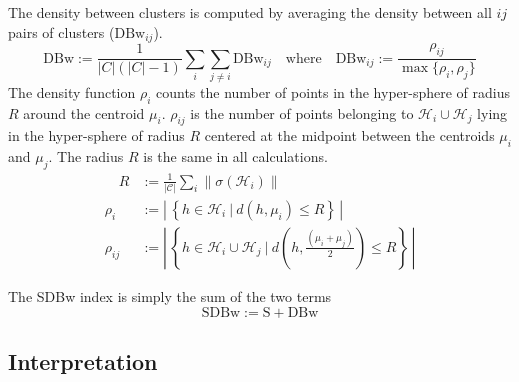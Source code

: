 The density between clusters is computed by averaging the density between all $ij$ pairs of clusters ($\textrm{DBw}_{ij}$).
\begin{equation*}
  \textrm{DBw} := \frac{1}{|C| (|C| - 1)} \sum_{i} \sum_{j \neq i} \textrm{DBw}_{ij}
  \quad \textrm{where} \quad
  \textrm{DBw}_{ij} := \frac{\rho_{ij}}{\max\{\rho_{i},\rho_{j}\}}
\end{equation*}
The density function $\rho_i$ counts the number of points in the hyper-sphere of radius $R$ around the centroid $\mu_i$. $\rho_{ij}$ is the number of points belonging to $\mathcal{H}_i \cup \mathcal{H}_j$ lying in the hyper-sphere of radius $R$ centered at the midpoint between the centroids $\mu_i$ and $\mu_j$. The radius $R$ is the same in all calculations.
\begin{align*}
  \quad R &:= \frac{1}{|\mathcal{C}|} \sum_i \| \sigma (\mathcal{H}_i)\| \\
  \rho_{i} &:= \left| \, \left\{ h \in \mathcal{H}_i \ | \ d(h, \mu_{i}) \le R \right\} \, \right| \\
  \rho_{ij} &:= \left| \, \left\{ h \in \mathcal{H}_i \cup \mathcal{H}_j \ | \
    d\left(h, \frac{\left(\mu_{i} + \mu_{j}\right)}{2}\right) \le R \right\} \, \right|
\end{align*}

The SDBw index is simply the sum of the two terms
\begin{equation}
  \textrm{SDBw} := \textrm{S} + \textrm{DBw}
  \label{eq:sdbw}
\end{equation}

\subsection{Interpretation}

